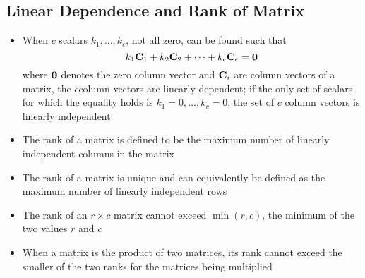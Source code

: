 \subsection{Linear Dependence and Rank of Matrix} 
\begin{itemize}
\item When $c$ scalars $k_1,\dots,k_c$, not all zero, can be found such that $$ k_1\mathbf{C}_1 + k_2\mathbf{C}_2 + \dots + k_c\mathbf{C}_c = \mathbf{0} $$ where $\mathbf{0}$ denotes the zero column vector and $\mathbf{C}_i$ are column vectors of a matrix, the $c$column vectors are linearly dependent; if the only set of scalars for which the equality holds is $k_1 = 0,\dots,k_c = 0$, the set of $c$ column vectors is linearly independent
\item The rank of a matrix is defined to be the maximum number of linearly independent columns in the matrix 
\item The rank of a matrix is unique and can equivalently be defined as the maximum number of linearly independent rows
\item The rank of an $r \times c$ matrix cannot exceed $\min(r, c)$, the minimum of the two values $r$ and $c$ 
\item When a matrix is the product of two matrices, its rank cannot exceed the smaller of the two ranks for the matrices being multiplied 
\end{itemize}

